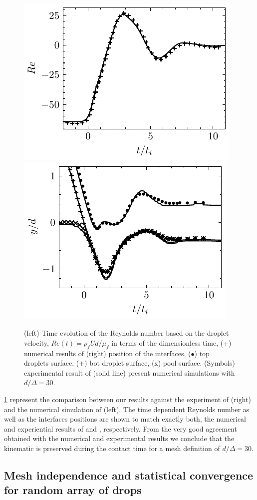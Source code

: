 \begin{figure}[h!]
    \centering
    \includegraphics[height = 0.3\textwidth]{image/VALIDATION2.0/Longmire/Re.pdf}
    \includegraphics[height = 0.3\textwidth]{image/VALIDATION2.0/Longmire/Dist.pdf}
    \caption{(left) Time evolution of the Reynolds number based on the droplet velocity, $Re(t) = \rho_fU d /\mu_f$ in terms of the dimensionless time, (+) numerical results of  \citet{balcazar2015multiple} (right)  position of the interfaces, ($\bullet$) top droplets surface, ($+$) bot droplet surface, (x) pool surface. (Symbols) experimental result of \citet{mohamed2003drop} (solid line) present numerical simulations with $d/\Delta = 30$. }
    \label{fig:resultslong}
\end{figure}
\ref{fig:resultslong} represent the comparison between our results against the experiment of \citet{mohamed2003drop} (right) and the numerical simulation of \citet{balcazar2015multiple} (left). 
The time dependent Reynolds number as well as the interfaces positions are shown to match exactly both, the numerical and experiential results of \citet{balcazar2015multiple} and \citet{mohamed2003drop}, respectively. 
From the very good agreement obtained with the numerical and experimental results we conclude that the kinematic is preserved during the contact time for a mesh definition of $d/\Delta = 30$. 

\subsection*{Mesh independence and statistical convergence for random array of drops}

